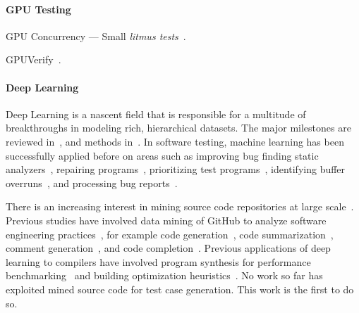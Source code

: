 







\paragraph{GPU Testing}  GPU Concurrency --- Small \emph{litmus tests}~\cite{Alglave2015}.

GPUVerify~\cite{Bardsley2014}.


\paragraph{Deep Learning}
Deep Learning is a nascent field that is responsible for a multitude of breakthroughs in modeling rich, hierarchical datasets. The major milestones are reviewed in~\cite{Wang2017}, and methods in~\cite{Schmidhuber2014}. In software testing,
machine learning has been successfully applied before on areas such as improving bug finding static analyzers~\cite{Heo2017,Koc2017}, repairing programs~\cite{Koukoutos2017a,White}, prioritizing test programs~\cite{Chen2017}, identifying buffer overruns~\cite{Choi2016}, and processing bug reports~\cite{Lam2016,Huo2016}.

There is an increasing interest in mining source code repositories at large scale~\cite{Allamanis2013a,White2015a,Bird2009}. Previous studies have involved data mining of GitHub to analyze software engineering practices~\cite{Wu2014,Guzman2014,Baishakhi2014a,Vasilescu2015}, for example code generation~\cite{Zhang2015a}, code summarization~\cite{Allamanis2016}, comment generation~\cite{Wong2013}, and code completion~\cite{Raychev2014}. Previous applications of deep learning to compilers have involved program synthesis for performance benchmarking~\cite{Cummins2017a} and building optimization heuristics~\cite{Cummins2017b}. No work so far has exploited mined source code for test case generation. This work is the first to do so.

